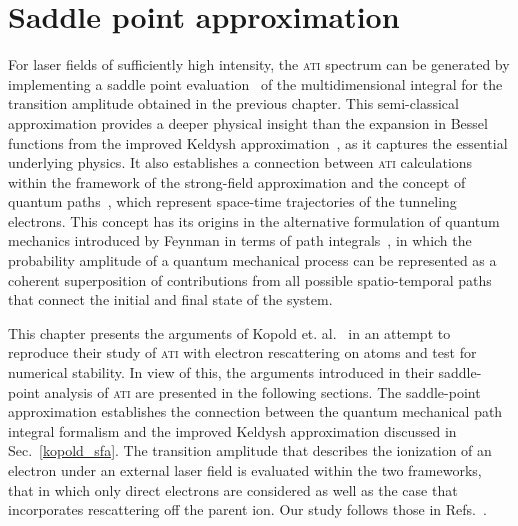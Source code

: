 \chapter{Saddle point approximation}
\label{cha:sp_approx}



For laser fields of sufficiently high intensity, the \textsc{ati}
spectrum can be generated by implementing a saddle point
evaluation~\cite{LewensteinSPA_1994} of the multidimensional integral
for the transition amplitude obtained in the previous chapter. This
semi-classical approximation provides a deeper physical insight than
the expansion in Bessel functions from the improved Keldysh
approximation~\cite{Kopold_1997sfa}, as it captures the essential
underlying physics. It also establishes a connection between
\textsc{ati} calculations within the framework of the strong-field
approximation and the concept of quantum
paths~\cite{KopoldOptComm2000}, which represent space-time
trajectories of the tunneling electrons. This concept has its origins
in the alternative formulation of quantum mechanics introduced by
Feynman in terms of path integrals~\cite{RevModPhysFeynman}, in which
the probability amplitude of a quantum mechanical process can be
represented as a coherent superposition of contributions from all
possible spatio-temporal paths that connect the initial and final
state of the system.

This chapter presents the arguments of Kopold
et. al.~\cite{KopoldOptComm2000,phd_Kopold} in an attempt to reproduce
their study of \textsc{ati} with electron rescattering on atoms and
test for numerical stability. In view of this, the arguments
introduced in their saddle-point analysis of \textsc{ati} are
presented in the following sections. The saddle-point approximation
establishes the connection between the quantum mechanical path
integral formalism and the improved Keldysh approximation discussed in
Sec.~\ref{kopold_sfa}. The transition amplitude that describes the
ionization of an electron under an external laser field is evaluated
within the two frameworks, that in which only direct electrons are
considered as well as the case that incorporates rescattering off the
parent ion. Our study follows those in Refs.~\cite{Kopold_1997sfa,
  KopoldOptComm2000}.

